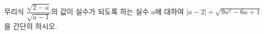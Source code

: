 \hspace*{2mm}\begin{minipage}[t]{\dimexpr\linewidth-2mm\relax}\vspace{0pt}
무리식 $\dfrac{\sqrt{2-a}}{\sqrt{a-1}}$의 값이 실수가 되도록 하는 실수 $a$에 대하여 $|a-2|+\sqrt{9a^2-6a+1}$을 간단히 하시오.\end{minipage}
